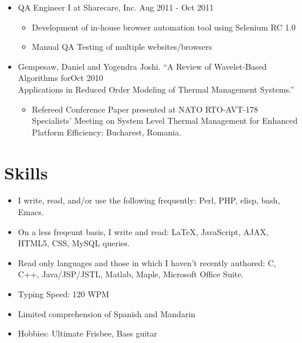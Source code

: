 \documentclass[10pt]{article}
\newenvironment{myitem}{
  \begin{itemize}
    \setlength{\itemsep}{1pt}
    \setlength{\parskip}{0pt}
    \setlength{\parsep}{0pt}
}{\end{itemize}}
\begin{document}
\begin{myitem}
\item QA Engineer I at Sharecare, Inc. \hfill Aug 2011 - Oct 2011
  \begin{myitem}
  \item Development of in-house browser automation tool using Selenium RC 1.0
  \item Manual QA Testing of multiple websites/browsers
  \end{myitem}

\item Gempesaw, Daniel and Yogendra Joshi. ``A Review of Wavelet-Based Algorithms for\hfill Oct 2010\\
  Applications in Reduced Order Modeling of Thermal Management Systems.''
  \begin{myitem}
  \item Refereed Conference Paper presented at NATO RTO-AVT-178 Specialists' Meeting on System Level Thermal Management for Enhanced Platform Efficiency: Bucharest, Romania.
  \end{myitem}
\end{myitem}

\section{Skills}
\begin{myitem}
\item I write, read, and/or use the following frequently: Perl, PHP, elisp, bash, Emacs.
\item On a less freqeunt basis, I write and read: \LaTeX, JavaScript, AJAX, HTML5, CSS, MySQL queries.
\item Read only languages and those in which I haven't recently authored: C, C++, Java/JSP/JSTL, Matlab, Maple, Microsoft Office Suite.
\item Typing Speed: 120 WPM
\item Limited comprehension of Spanish and Mandarin
\item Hobbies: Ultimate Frisbee, Bass guitar
\end{myitem}
\end{document}
